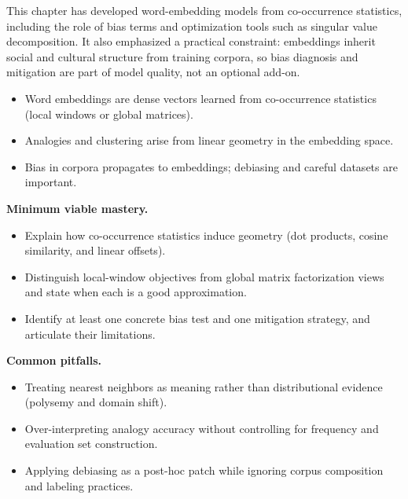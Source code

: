 This chapter has developed word-embedding models from co-occurrence statistics, including the role of bias terms and optimization tools such as singular value decomposition. It also emphasized a practical constraint: embeddings inherit social and cultural structure from training corpora, so bias diagnosis and mitigation are part of model quality, not an optional add-on.

\begin{tcolorbox}[summarybox, title={Key takeaways}]
\begin{itemize}
    \item Word embeddings are dense vectors learned from co-occurrence statistics (local windows or global matrices).
    \item Analogies and clustering arise from linear geometry in the embedding space.
    \item Bias in corpora propagates to embeddings; debiasing and careful datasets are important.
\end{itemize}

\medskip
\noindent\textbf{Minimum viable mastery.}
\begin{itemize}
    \item Explain how co-occurrence statistics induce geometry (dot products, cosine similarity, and linear offsets).
    \item Distinguish local-window objectives from global matrix factorization views and state when each is a good approximation.
    \item Identify at least one concrete bias test and one mitigation strategy, and articulate their limitations.
\end{itemize}

\noindent\textbf{Common pitfalls.}
\begin{itemize}
    \item Treating nearest neighbors as meaning rather than distributional evidence (polysemy and domain shift).
    \item Over-interpreting analogy accuracy without controlling for frequency and evaluation set construction.
    \item Applying debiasing as a post-hoc patch while ignoring corpus composition and labeling practices.
\end{itemize}
\end{tcolorbox}

